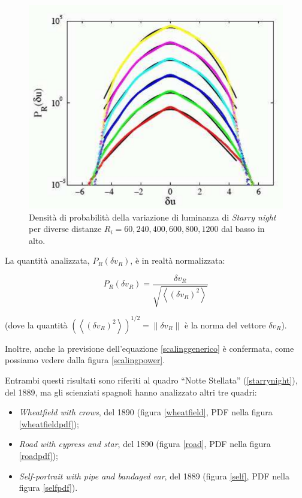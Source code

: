 \documentclass[12pt,a4paper]{article}
\newcommand{\norm}[1]{\left\lVert#1\right\rVert}
\numberwithin{equation}{section}
\begin{document}
\begin{figure}[h]
    \centering
    \includegraphics[scale=0.5]{gauss.png}
    \caption{Densità di probabilità della variazione di luminanza di \emph{Starry night} per diverse distanze $R_i = 60, 240, 400, 600, 800, 1200$ dal basso in alto.}
    \label{gaussians}
\end{figure}

La quantità analizzata, $P_R(\delta v_R)$, è in realtà normalizzata:

\begin{equation}
P_R(\delta v_R)=
\frac{\delta v_R}{\sqrt{\left\langle
(\delta v_R )^2
\right\rangle}}
\end{equation}

(dove la quantità $\left(\left\langle
(\delta v_R )^2
\right\rangle\right)^{1/2} = \norm{\delta v_R}$ è la norma del vettore $\delta v_R$).

Inoltre, anche la previsione dell'equazione \ref{scalinggenerico} è confermata, come possiamo vedere dalla figura \ref{scalingpower}.

Entrambi questi risultati sono riferiti al quadro ``Notte Stellata'' (\ref{starrynight}), del 1889, ma gli scienziati spagnoli hanno analizzato altri tre quadri:

\begin{itemize}
    \item \emph{Wheatfield with crows}, del 1890 (figura \ref{wheatfield}, PDF nella figura \ref{wheatfieldpdf});
    \item \emph{Road with cypress and star}, del 1890 (figura \ref{road}, PDF nella figura \ref{roadpdf});
    \item \emph{Self-portrait with pipe and bandaged ear}, del 1889 (figura \ref{self}, PDF nella figura \ref{selfpdf}).
\end{itemize}
\end{document}
